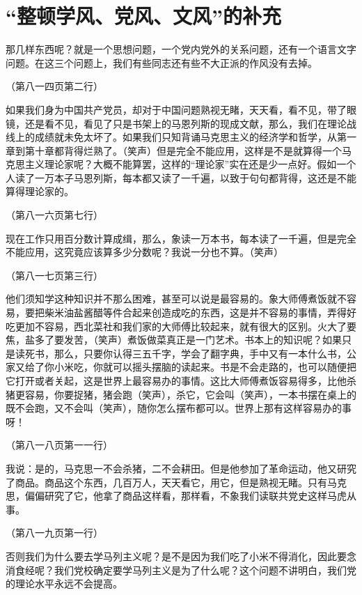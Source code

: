 \section[“整顿学风、党风、文风”的补充（一九四二年二月一日）]{“整顿学风、党风、文风”的补充}


那几样东西呢？就是一个思想问题，一个党内党外的关系问题，还有一个语言文字问题。在这三个问题上，我们有些同志还有些不大正派的作风没有去掉。

（第八一四页第二行）

如果我们身为中国共产党员，却对于中国问题熟视无睹，天天看，看不见，带了眼镜，还是看不见，看见了只是书架上的马恩列斯的现成文献，那么，我们在理论战线上的成绩就未免太坏了。如果我们只知背诵马克思主义的经济学和哲学，从第一章到第十章都背得烂熟了。（笑声）但是完全不能应用，这样是不是就算得一个马克思主义理论家呢？大概不能算罢，这样的“理论家”实在还是少一点好。假如一个人读了一万本子马恩列斯，每本都又读了一千遍，以致于句句都背得，这还是不能算得理论家的。

（第八一六页第七行）

现在工作只用百分数计算成缉，那么，象读一万本书，每本读了一千遍，但是完全不能应用，这究竟应该算多少分数呢？我说一分也不算。（笑声）

（第八一七页第三行）

他们须知学这种知识并不那么困难，甚至可以说是最容易的。象大师傅煮饭就不容易，要把柴米油盐酱醋等件合起来创造成吃的东西，这是并不容易的事情，弄得好吃更加不容易，西北菜社和我们家的大师傅比较起来，就有很大的区别。火大了要焦，盐多了要发苦，（笑声）煮饭做菜真正是一门艺术。书本上的知识呢？如果只是读死书，那么，只要你认得三五千字，学会了翻字典，手中又有一本什么书，公家又给了你小米吃，你就可以摇头摆脑的读起来。书是不会走路的，也可以随便把它打开或者关起，这是世界上最容易办的事情。这比大师傅煮饭容易得多，比他杀猪更容易，你要捉猪，猪会跑（笑声），杀它，它会叫（笑声），一本书摆在桌上的既不会跑，又不会叫（笑声），随你怎么摆布都可以。世界上那有这样容易办的事呀！

（第八一八页第一一行）

我说：是的，马克思一不会杀猪，二不会耕田。但是他参加了革命运动，他又研究了商品。商品这个东西，几百万人，天天看它，用它，但是熟视无睹。只有马克思，偏偏研究了它，他拿了商品这样看，那样看，不象我们读联共党史这样马虎从事。

（第八一九页第一行）

否则我们为什么要去学马列主义呢？是不是因为我们吃了小米不得消化，因此要念消食经呢？我们党校确定要学马列主义是为了什么呢？这个问题不讲明白，我们党的理论水平永远不会提高。

